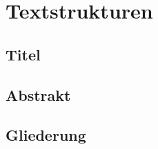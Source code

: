 \chapter{Textstrukturen}
\section{Titel}
\label{cha:Titel}
\section{Abstrakt}
\label{cha:Abstrakt}
\begin{verbatim*} 
	\begin{abstract}
...
	\end{abstract}
\end{verbatim*} %
\section{Gliederung}
\label{cha:gliederung}

